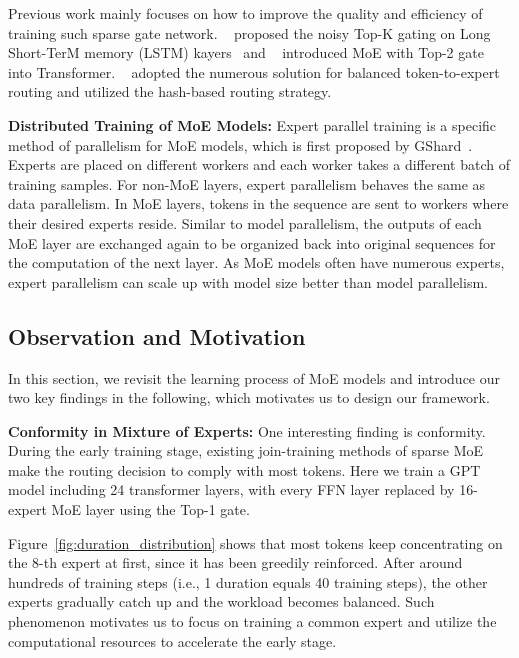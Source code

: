 Previous work mainly focuses on how to improve the quality and efficiency of training such sparse gate network. ~\citet{DBLP:lstm_moe} proposed the noisy Top-K gating on Long Short-TerM memory (LSTM) kayers~\cite{DBLP:journals/neco/lstm} and ~\citet{DBLP:gshard} introduced MoE with Top-2 gate into Transformer.
~\citet{lewis2021base} adopted the numerous solution for balanced  token-to-expert routing and \citet{roller2021hash} utilized the hash-based routing strategy.

\textbf{Distributed Training of MoE Models:}
Expert parallel training is a specific method of parallelism for MoE models, which is first proposed by GShard~\cite{DBLP:gshard}. Experts are placed on different workers and each worker takes a different batch of training samples. For non-MoE layers, expert parallelism behaves the same as data parallelism. In MoE layers, tokens in the sequence are sent to workers where their desired experts reside. Similar to model parallelism, the outputs of each MoE layer are exchanged again to be organized back into original sequences for the computation of the next layer. As MoE models often have numerous experts, expert parallelism can scale up with model size better than model parallelism.

\subsection{Observation and Motivation}
\label{sec:motivation}
In this section, we revisit the learning process of MoE models and introduce our two key findings in the following, which motivates us to design our \evomoe framework.

\textbf{Conformity in Mixture of Experts:} One interesting finding is conformity. During the early training stage, existing join-training methods of sparse MoE make the routing decision to comply with most tokens.
Here we train a GPT model including 24 transformer layers, with every FFN layer replaced by 16-expert MoE layer using the Top-1 gate. 

Figure~\ref{fig:duration_distribution} shows that most tokens keep concentrating on the 8-th expert at first, since it has been greedily reinforced.
After around hundreds of training steps (i.e., 1 duration equals 40 training steps), the other experts gradually catch up and the workload becomes balanced. Such phenomenon motivates us to focus on training a common expert and utilize the computational resources to accelerate the early stage.

